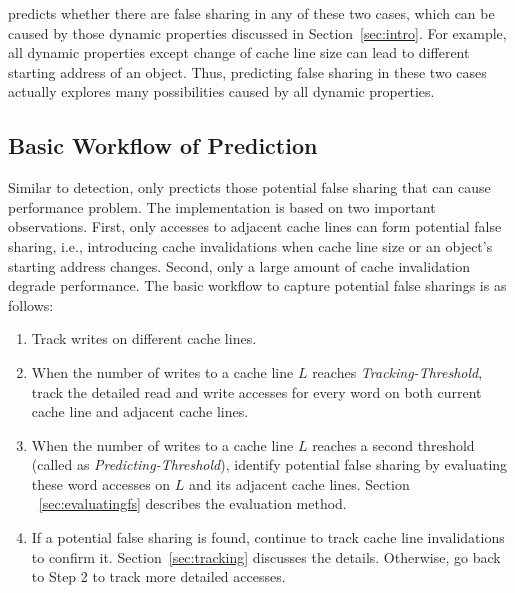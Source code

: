  predicts whether there are false sharing 
in any of these two cases, which can
be caused by those dynamic properties discussed in Section~\ref{sec:intro}.
For example, all dynamic properties except change of cache line size 
can lead to different starting address of an object. 
Thus, predicting false sharing in these two cases actually 
explores many possibilities caused by all dynamic properties.

\subsection{Basic Workflow of Prediction}
\label{sec:predictionmechanism} 

Similar to detection, 
 only precticts those potential false sharing that can 
cause performance problem.
The implementation is based on
two important observations. First, only accesses to 
adjacent cache lines can form potential false sharing, 
i.e., introducing cache invalidations when cache line size
or an object's starting address changes.
Second, only a large amount of cache invalidation degrade performance.
The basic workflow
to capture potential false sharings is as follows:

\begin{enumerate}
\item
Track writes on different cache lines. 

\item
When the number of writes to a cache line $L$ reaches {\it Tracking-Threshold},
track the detailed read and write accesses for every word on both current cache line 
and adjacent cache lines. 

\item
When the number of writes to a cache line $L$ reaches a second threshold (called as
{\it Predicting-Threshold}), 
identify potential false sharing by evaluating these word accesses on $L$ and 
its adjacent cache lines. Section ~\ref{sec:evaluatingfs} describes the evaluation method.

\item
If a potential false sharing is found, continue to track cache line invalidations
to confirm it. Section~\ref{sec:tracking} discusses the details.
Otherwise, go back to Step 2 to track more detailed accesses.
 
\end{enumerate}

